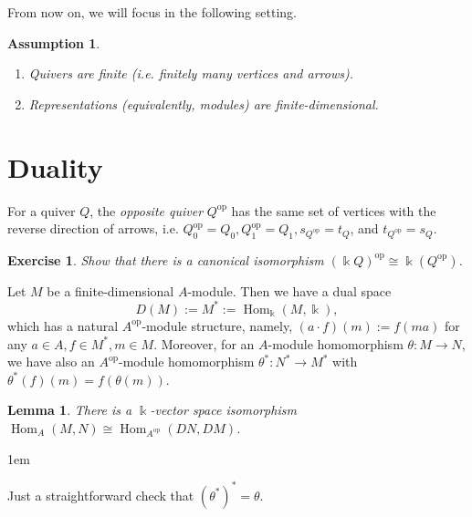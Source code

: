 \documentclass[11pt,a4paper]{article}
\makeatletter
\numberwithin{equation}{section}
\renewenvironment{proof}[1][\proofname]{\par
    \pushQED{\qed}%
    \normalfont \topsep0\p@\@plus6\p@ \labelsep1em\relax
    \trivlist
    \item[\hskip\labelsep\indent
        \bfseries #1]\ignorespaces
    \mbox{}
}{
    \popQED\endtrivlist\@endpefalse
}
\theoremstyle{all}
\newtheorem{lemma}[theorem]{Lemma}
\newtheorem{exercise}[theorem]{Exercise}
\newtheorem{assumption}[theorem]{Assumption}
\theoremstyle{remark}
\newcommand{\Hom}{\operatorname{Hom}\nolimits}
\newcommand{\op}{\mathrm{op}}
\newcommand{\defn}[1]{\textsl{\color{darkblue} #1}}
\makeatother
\begin{document}
From now on, we will focus in the following setting.

\begin{assumption}
\begin{enumerate}
\item Quivers are finite (i.e. finitely many vertices and arrows). 
\item Representations (equivalently, modules) are finite-dimensional.
\end{enumerate}


\end{assumption}


\section{Duality}

For a quiver $Q$, the \defn{opposite quiver} $Q^\op$ has the same set of vertices with the reverse direction of arrows, i.e. $Q_0^\op=Q_0, Q_1^\op=Q_1, s_{Q^\op}=t_Q$, and $t_{Q^\op}=s_Q$.

\begin{exercise}
Show that there is a canonical isomorphism $(\Bbbk Q)^\op \cong \Bbbk (Q^\op)$.
\end{exercise}

Let $M$ be a finite-dimensional $A$-module.  Then we have a dual space
\[
D(M):= M^* := \Hom_{\Bbbk}(M,\Bbbk),
\]
which has a natural $A^\op$-module structure, namely, $(a\cdot f)(m):=f(ma)$
for any $a\in A, f\in M^*, m\in M$.
Moreover, for an $A$-module homomorphism $\theta:M\to N$, we have also an $A^\op$-module homomorphism $\theta^*:N^*\to M^*$ with $\theta^*(f)(m) = f(\theta(m))$.

\begin{lemma}
There is a $\Bbbk$-vector space isomorphism $\Hom_A(M,N)\cong \Hom_{A^\op}(DN,DM)$.
\end{lemma}
\begin{proof}
Just a straightforward check that $(\theta^*)^*=\theta$.
\end{proof}
\end{document}
